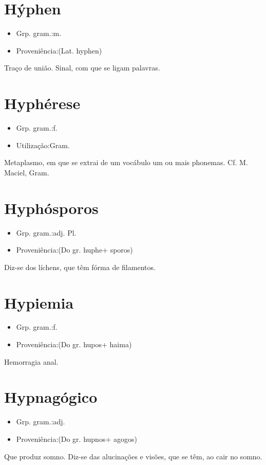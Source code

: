 \documentclass{article}
\begin{document}
\section{Hýphen}
\begin{itemize}
\item {Grp. gram.:m.}
\end{itemize}
\begin{itemize}
\item {Proveniência:(Lat. \textunderscore hyphen\textunderscore )}
\end{itemize}
Traço de união.
Sinal, com que se ligam palavras.
\section{Hyphérese}
\begin{itemize}
\item {Grp. gram.:f.}
\end{itemize}
\begin{itemize}
\item {Utilização:Gram.}
\end{itemize}
Metaplasmo, em que se extrai de um vocábulo um ou mais phonemas. Cf. M. Maciel, \textunderscore Gram.\textunderscore 
\section{Hyphósporos}
\begin{itemize}
\item {Grp. gram.:adj. Pl.}
\end{itemize}
\begin{itemize}
\item {Proveniência:(Do gr. \textunderscore huphe\textunderscore  + \textunderscore sporos\textunderscore )}
\end{itemize}
Diz-se dos líchens, que têm fórma de filamentos.
\section{Hypiemia}
\begin{itemize}
\item {Grp. gram.:f.}
\end{itemize}
\begin{itemize}
\item {Proveniência:(Do gr. \textunderscore hupos\textunderscore  + \textunderscore haima\textunderscore )}
\end{itemize}
Hemorragia anal.
\section{Hypnagógico}
\begin{itemize}
\item {Grp. gram.:adj.}
\end{itemize}
\begin{itemize}
\item {Proveniência:(Do gr. \textunderscore hupnos\textunderscore  + \textunderscore agogos\textunderscore )}
\end{itemize}
Que produz somno.
Diz-se das alucinações e visões, que se têm, ao cair no somno.
\end{document}
